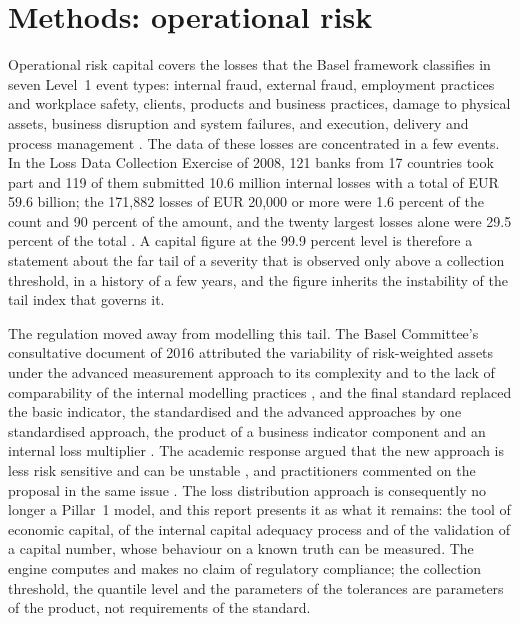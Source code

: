 \section{Methods: operational risk}
\label{sec:oprisk}



Operational risk capital covers the losses that the Basel framework classifies in seven Level~1 event types: internal fraud, external
fraud, employment practices and workplace safety, clients, products and business practices, damage to physical assets, business
disruption and system failures, and execution, delivery and process management \citep{oprisk:ope25}. The data of these losses are
concentrated in a few events. In the Loss Data
Collection Exercise of 2008, 121 banks from 17 countries took part and 119 of them submitted 10.6 million internal losses with a
total of EUR 59.6 billion; the 171,882 losses of EUR 20,000 or more were 1.6 percent of the count and 90 percent of the amount, and the twenty largest
losses alone were 29.5 percent of the total \citep{oprisk:bcbs160}. A capital figure at the 99.9 percent level is therefore a
statement about the far tail of a severity that is observed only above a collection threshold, in a history of a few years, and
the figure inherits the instability of the tail index that governs it.

The regulation moved away from modelling this tail. The Basel Committee's consultative document of 2016 attributed the
variability of risk-weighted assets under the advanced measurement approach to its complexity and to the lack of comparability of
the internal modelling practices \citep{oprisk:bcbs2016}, and the final standard replaced the basic indicator, the standardised
and the advanced approaches by one standardised approach, the product of a business indicator component and an internal loss
multiplier \citep{credit-capital:basel-d424,oprisk:ope25}. The academic response argued that the new approach is less risk sensitive and can
be unstable \citep{oprisk:peters2016}, and practitioners commented on the proposal in the same issue \citep{oprisk:mignola2016}. The loss
distribution approach is consequently no longer a Pillar~1 model, and this report presents it as what it remains: the tool of
economic capital, of the internal capital adequacy process and of the validation of a capital number, whose behaviour on a
known truth can be measured. The engine computes and makes no claim of regulatory compliance; the collection threshold, the
quantile level and the parameters of the tolerances are parameters of the product, not requirements of the standard.

